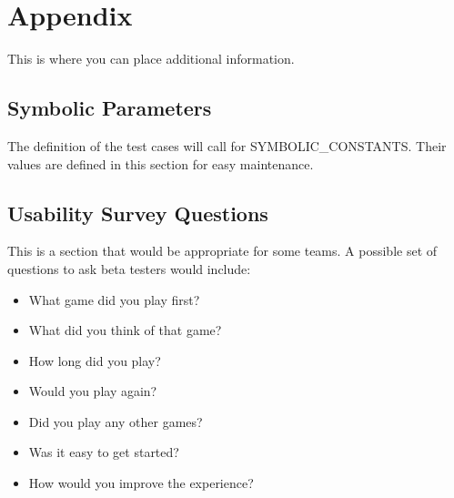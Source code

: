 \documentclass[12pt, titlepage]{article}
\begin{document}


\newpage

\section{Appendix}

This is where you can place additional information.

\subsection{Symbolic Parameters}

The definition of the test cases will call for SYMBOLIC\_CONSTANTS.
Their values are defined in this section for easy maintenance.

\subsection{Usability Survey Questions}

This is a section that would be appropriate for some teams.
A possible set of questions to ask beta testers would include:
\begin{itemize}
    \item What game did you play first?
    \item What did you think of that game?
    \item How long did you play?
    \item Would you play again?
    \item Did you play any other games?
    \item Was it easy to get started?
    \item How would you improve the experience?
\end{itemize}
\end{document}
